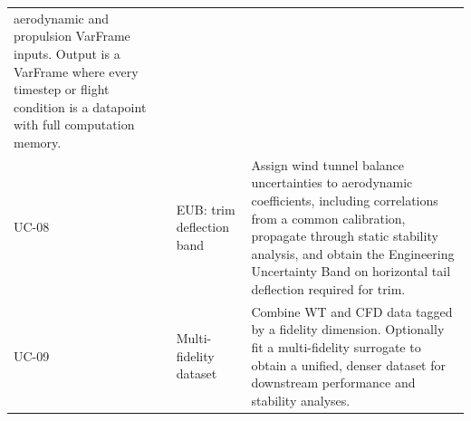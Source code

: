 \begin{table}[H]
\begin{tabularx}{\textwidth}{@{}llX@{}}
aerodynamic and propulsion VarFrame inputs. Output is a VarFrame where every
timestep or flight condition is a datapoint with full computation memory.\\
\addlinespace
UC-08 & EUB: trim deflection band &
Assign wind tunnel balance uncertainties to aerodynamic coefficients,
including correlations from a common calibration, propagate through static
stability analysis, and obtain the Engineering Uncertainty Band on
horizontal tail deflection required for trim.\\
\addlinespace
UC-09 & Multi-fidelity dataset &
Combine WT and CFD data tagged by a fidelity dimension. Optionally fit a
multi-fidelity surrogate to obtain a unified, denser dataset for downstream
performance and stability analyses.\\
\bottomrule
\end{tabularx}
\end{table}
